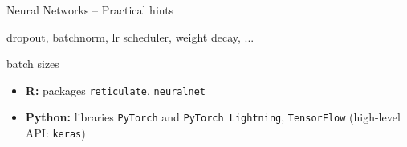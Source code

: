 \begin{frame}{Neural Networks -- Practical hints}

dropout, batchnorm, lr scheduler, weight decay, ...


batch sizes

% 
% 
% 
% 
% 

\medskip
 

\begin{itemize}
  \item \textbf{R:} packages \texttt{reticulate}, \texttt{neuralnet}
  \item \textbf{Python:} libraries \texttt{PyTorch} and \texttt{PyTorch 
  Lightning}, \texttt{TensorFlow} (high-level API: \texttt{keras})
\end{itemize}

\end{frame}

\undraft